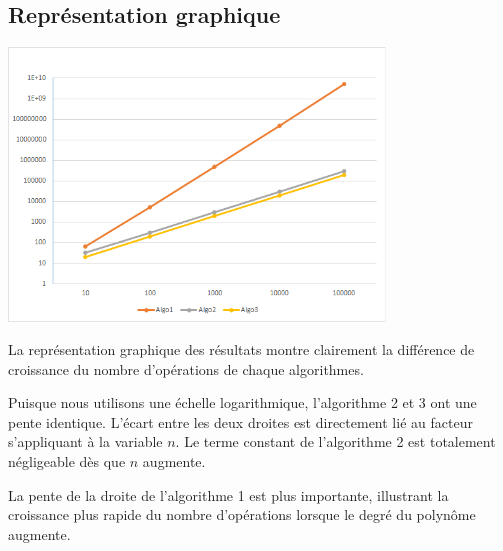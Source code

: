 \documentclass[11pt,a4paper]{article}
\begin{document}
\subsection{Représentation graphique}

\begin{center}
\includegraphics[width=10cm]{img_graph}
\end{center}

La représentation graphique des résultats montre clairement la différence de croissance du nombre d'opérations de chaque algorithmes. 

Puisque nous utilisons une échelle logarithmique, l'algorithme 2 et 3 ont une pente identique. L'écart entre les deux droites est directement lié au facteur s'appliquant à la variable $n$. Le terme constant de l'algorithme 2 est totalement négligeable dès que $n$ augmente.

La pente de la droite de l'algorithme 1 est plus importante, illustrant la croissance plus rapide du nombre d'opérations lorsque le degré du polynôme augmente.
\end{document}
